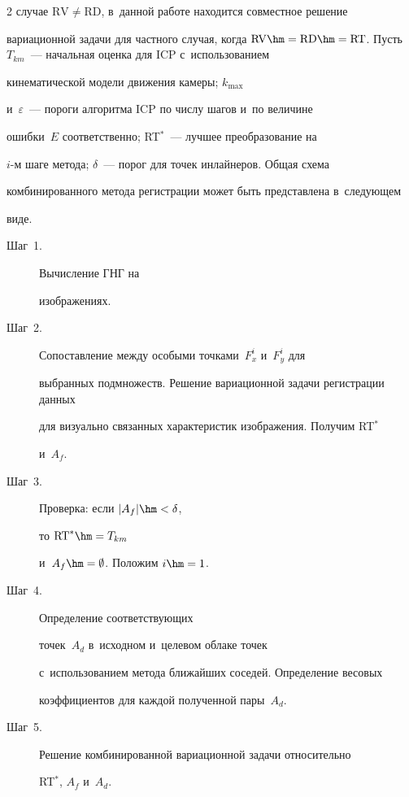 \begin{multicols}{2}
случае $\mathrm{RV}\not= \mathrm{RD}$, в~данной работе находится совместное решение 

вариационной задачи для част\-но\-го случая, когда $\mathrm{RV}\hm= \mathrm{RD}

\hm= \mathrm{RT}$. Пусть~${T}_{km}$~--- начальная оценка для ICP с~использованием 

кинематической модели движения камеры; ${k}_{\max}$  

и~$\varepsilon$~--- пороги алгоритма ICP по числу шагов и~по величине 

ошибки~${E}$ соответственно; RT$^*$~--- лучшее преобразование на 

$i$-м шаге метода; $\delta$~--- порог для точек ин\-лай\-не\-ров. Общая схема 

комбинированного метода регистрации может быть представлена в~сле\-ду\-ющем 

виде.

\begin{description}

\item[Шаг~1.] Вычисление ГНГ на 

изображениях.

\item[Шаг~2.] Сопоставление между особыми точками~$F_x^i$ и~$F_y^i$ для 

выбранных подмножеств. Решение вариационной задачи регистрации данных 

для визуально связанных характеристик изоб\-ра\-же\-ния. Получим RT$^*$ 

и~${A}_{{f}}$.

\item[Шаг~3.] Проверка: если $\vert {A}_{{f}} \vert \hm <\delta$, 

то $\mathrm{RT}^* \hm={T}_{{km}}$ 

и~${A}_{{f}}\hm=\emptyset$. Положим $i\hm = 1$.

\item[Шаг~4.] Определение соответствующих 

точек~${A}_{{d}}$ в~исходном и~целевом облаке точек 

с~использованием метода ближайших соседей. Определение весовых 

коэффициентов для каж\-дой полученной пары~${A}_{{d}}$.

\item[Шаг~5.] Решение комбинированной вариационной задачи относительно 

RT$^*$, ${A}_{{f}}$ и~${A}_{d}$.


\end{description}
\end{multicols}
